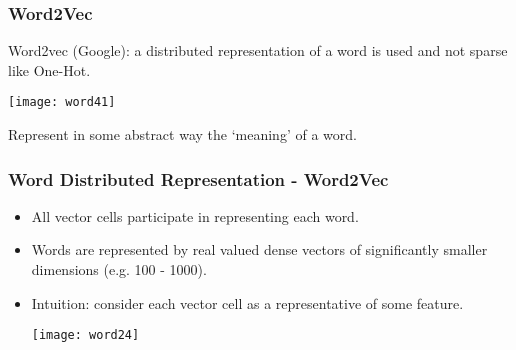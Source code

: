 \begin{frame}[fragile]\frametitle{Word2Vec}
Word2vec  (Google): a distributed representation of a word is used and not sparse like One-Hot.
\begin{center}
\texttt{[image: word41]}
\end{center}
Represent in some abstract way the `meaning' of a word.

\end{frame}

\begin{frame}[fragile]\frametitle{Word Distributed Representation - Word2Vec}
\begin{itemize}
\item All vector cells participate in representing each word.
\item Words are represented by real valued dense vectors of significantly smaller dimensions (e.g. 100 - 1000).
\item  Intuition: consider each vector cell as a representative of some feature.
\begin{center}
\texttt{[image: word24]}
\end{center}
\end{itemize}
\end{frame}




